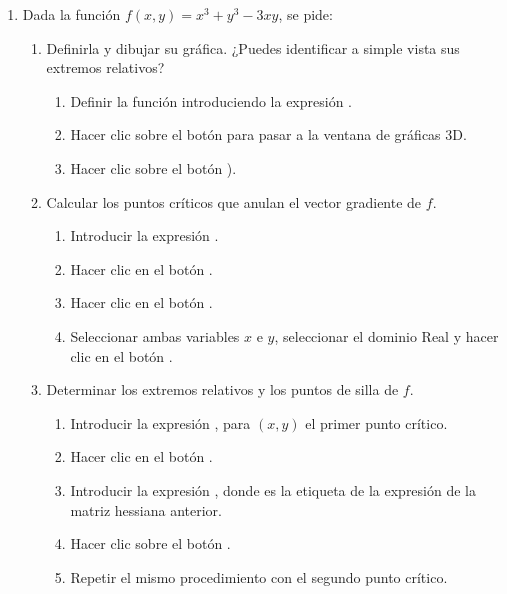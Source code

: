 \begin{enumerate}[leftmargin=*]
\item Dada la función $f(x,y)=x^3+y^3-3xy$, se pide:
\begin{enumerate}
\item Definirla y dibujar su gráfica. ¿Puedes identificar a simple vista sus extremos relativos?
\begin{indicacion}
\begin{enumerate}
\item Definir la función introduciendo la expresión .
\item Hacer clic sobre el botón  para pasar a la ventana de gráficas 3D.
\item Hacer clic sobre el botón ).
\end{enumerate}
\end{indicacion}

\item Calcular los puntos críticos que anulan el vector gradiente de $f$. 
\begin{indicacion}
\begin{enumerate}
\item Introducir la expresión .
\item Hacer clic en el botón .
\item Hacer clic en el botón .
\item Seleccionar ambas variables $x$ e $y$, seleccionar el dominio Real y hacer clic en el botón .
\end{enumerate}
\end{indicacion}

\item Determinar los extremos relativos y los puntos de silla de $f$.
\begin{indicacion}
\begin{enumerate}
\item Introducir la expresión , para $(x,y)$ el primer punto crítico.
\item Hacer clic en el botón .
\item Introducir la expresión , donde  es la etiqueta de la expresión de la matriz
hessiana anterior.
\item Hacer clic sobre el botón .
\item Repetir el mismo procedimiento con el segundo punto crítico. 
\end{enumerate}
\end{indicacion}
\end{enumerate}

\end{enumerate}


